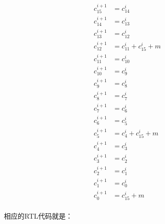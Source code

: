 \documentclass[
]{article}
\begin{document}
\begin{equation}
\begin{aligned}
c_{15}^{i+1}&=c_{14}^{i}\\
c_{14}^{i+1}&=c_{13}^{i}\\
c_{13}^{i+1}&=c_{12}^{i}\\
c_{12}^{i+1}&=c_{11}^{i}+c_{15}^i+m\\
c_{11}^{i+1}&=c_{10}^{i}\\
c_{10}^{i+1}&=c_{ 9}^{i}\\
c_{ 9}^{i+1}&=c_{ 8}^{i}\\
c_{ 8}^{i+1}&=c_{ 7}^{i}\\
c_{ 7}^{i+1}&=c_{ 6}^{i}\\
c_{ 6}^{i+1}&=c_{ 5}^{i}\\
c_{ 5}^{i+1}&=c_{ 4}^{i}+c_{15}^i+m\\
c_{ 4}^{i+1}&=c_{ 3}^{i}\\
c_{ 3}^{i+1}&=c_{ 2}^{i}\\
c_{ 2}^{i+1}&=c_{ 1}^{i}\\
c_{ 1}^{i+1}&=c_{ 0}^{i}\\
c_{ 0}^{i+1}&=c_{15}^i+m\\
\end{aligned}
\end{equation}

相应的RTL代码就是：
\end{document}
